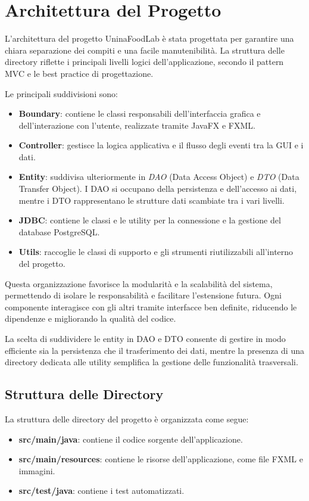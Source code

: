 \section{Architettura del Progetto}

L'architettura del progetto UninaFoodLab è stata progettata per garantire una chiara separazione dei compiti e una facile manutenibilità. La struttura delle directory riflette i principali livelli logici dell'applicazione, secondo il pattern MVC e le best practice di progettazione.

Le principali suddivisioni sono:
\begin{itemize}
    \item \textbf{Boundary}: contiene le classi responsabili dell'interfaccia grafica e dell'interazione con l'utente, realizzate tramite JavaFX e FXML.
    \item \textbf{Controller}: gestisce la logica applicativa e il flusso degli eventi tra la GUI e i dati.
    \item \textbf{Entity}: suddivisa ulteriormente in \textit{DAO} (Data Access Object) e \textit{DTO} (Data Transfer Object). I DAO si occupano della persistenza e dell'accesso ai dati, mentre i DTO rappresentano le strutture dati scambiate tra i vari livelli.
    \item \textbf{JDBC}: contiene le classi e le utility per la connessione e la gestione del database PostgreSQL.
    \item \textbf{Utils}: raccoglie le classi di supporto e gli strumenti riutilizzabili all'interno del progetto.
\end{itemize}
Questa organizzazione favorisce la modularità e la scalabilità del sistema, permettendo di isolare le responsabilità e facilitare l'estensione futura. Ogni componente interagisce con gli altri tramite interfacce ben definite, riducendo le dipendenze e migliorando la qualità del codice.

La scelta di suddividere le entity in DAO e DTO consente di gestire in modo efficiente sia la persistenza che il trasferimento dei dati, mentre la presenza di una directory dedicata alle utility semplifica la gestione delle funzionalità trasversali.

\subsection{Struttura delle Directory}
La struttura delle directory del progetto è organizzata come segue:
\begin{itemize}
    \item \textbf{src/main/java}: contiene il codice sorgente dell'applicazione.
    \item \textbf{src/main/resources}: contiene le risorse dell'applicazione, come file FXML e immagini.
    \item \textbf{src/test/java}: contiene i test automatizzati.
\end{itemize}
